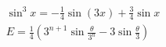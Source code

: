 \begin{multline*}
\sin ^3 x = -\frac{1}{4}\sin(3x) + \frac{3}{4}\sin x \\
E =\frac{1}{4}\left( 3^{n+1}\sin \frac{\theta}{3^{n}} -3\sin\frac{\theta}{3}\right) 
\end{multline*}
